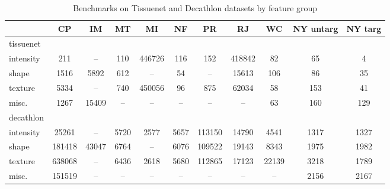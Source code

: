 \documentclass[sn-mathphys,Numbered]{sn-jnl}%
\theoremstyle{thmstyleone}%
\theoremstyle{thmstyletwo}%
\theoremstyle{thmstylethree}%
\begin{document}
\begin{table}[!hbt]
\centering
\caption {Benchmarks on Tissuenet and Decathlon datasets by feature group}
\label {table:BENCH}
\begin{tabular} { l  c  c  c  c  c  c  c   c    c c   } %
\toprule

   & CP &  IM &  MT &  MI & NF &  PR &  RJ & WC & NY untarg & NY targ \\
\midrule
\hspace{2mm}tissuenet &  &  &  &  &  &  &  &  &   &   \\
intensity & 211 & -- & 110 &446726 & 116 & 152 &418842 & 82 & 65  & 4   \\
shape  & 1516 & 5892 & 612 & -- & 54 & -- & 15613 & 106 & 86  & 35  \\
texture  & 5334 & -- & 740 &450056 & 96 & 875 & 62034 & 58 & 153  & 41  \\
misc.   & 1267 & 15409 & -- & -- & -- & -- & -- & 63 & 160  & 129  \\
\hspace{2mm}decathlon &  &  &  &  &  &  &  &  &   &   \\
intensity & 25261 & -- & 5720 & 2577 & 5657 &113150 & 14790 & 4541 & 1317  & 1327  \\
shape  &181418 & 43047 & 6764 & -- & 6076 &109522 & 19143 & 8343 & 1975  & 1982  \\
texture  &638068 & -- & 6436 & 2618 & 5680 &112865 & 17123 & 22139 & 3218  & 1789  \\
misc.   &151519 & -- & -- & -- & -- & -- & -- & -- & 2156  & 2167  \\
\bottomrule
\end{tabular}

\vspace{1ex}
\begin{tiny}
{\raggedright
\centering
\par}
\end{tiny}
\end{table}

\end{document}
